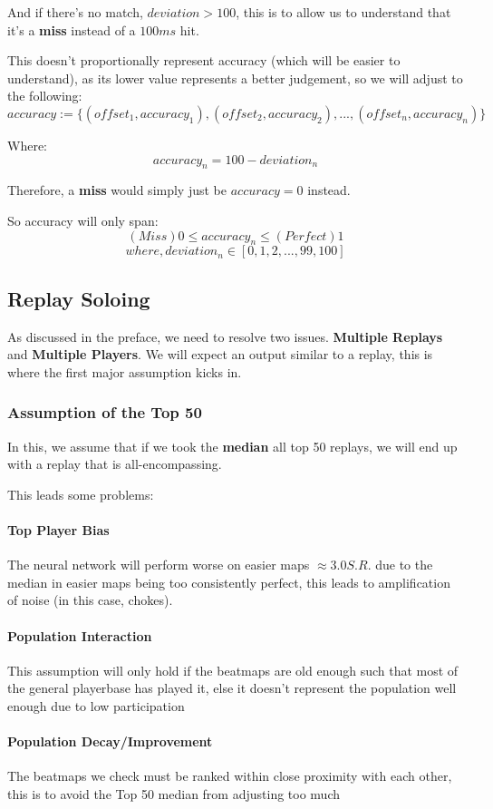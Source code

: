 And if there's no match, $deviation > 100$, this is to allow us to understand that it's a \textbf{miss} instead of a $100ms$ hit.

This doesn't proportionally represent accuracy (which will be easier to understand), as its lower value represents a better judgement, so we will adjust to the following:
$$ accuracy := \lbrace(offset_1, accuracy_1), (offset_2, accuracy_2), ..., (offset_n, accuracy_n)\rbrace $$

Where:
$$ accuracy_n = 100 - {deviation_n} $$

Therefore, a \textbf{miss} would simply just be $accuracy = 0$ instead.

So accuracy will only span:
$$ (Miss) 0 \leq accuracy_n \leq (Perfect) 1 $$
$$ where, deviation_n \in [0, 1, 2, ..., 99, 100] $$

\subsection{Replay Soloing}

As discussed in the preface, we need to resolve two issues. \textbf{Multiple Replays} and \textbf{Multiple Players}. We will expect an output similar to a replay, this is where the first major assumption kicks in.

\subsubsection{Assumption of the Top 50}
In this, we assume that if we took the \textbf{median} all top 50 replays, we will end up with a replay that is all-encompassing.

This leads some problems:

\paragraph{Top Player Bias} The neural network will perform worse on easier maps $ \approx 3.0 S.R. $ due to the median in easier maps being too consistently perfect, this leads to amplification of noise (in this case, chokes).
\paragraph{Population Interaction} This assumption will only hold if the beatmaps are old enough such that most of the general playerbase has played it, else it doesn't represent the population well enough due to low participation
\paragraph{Population Decay/Improvement} The beatmaps we check must be ranked within close proximity with each other, this is to avoid the Top 50 median from adjusting too much

